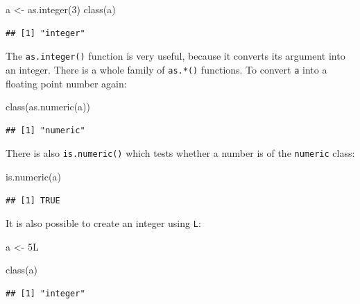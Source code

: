 \documentclass[
]{article}
\newenvironment{Shaded}{\begin{snugshade}}{\end{snugshade}}
\newcommand{\DecValTok}[1]{\textcolor[rgb]{0.00,0.00,0.81}{#1}}
\newcommand{\FunctionTok}[1]{\textcolor[rgb]{0.00,0.00,0.00}{#1}}
\newcommand{\NormalTok}[1]{#1}
\newcommand{\OtherTok}[1]{\textcolor[rgb]{0.56,0.35,0.01}{#1}}
\begin{document}
\begin{Shaded}
\begin{Highlighting}[]
\NormalTok{a  }\OtherTok{\textless{}{-}} \FunctionTok{as.integer}\NormalTok{(}\DecValTok{3}\NormalTok{)}
\FunctionTok{class}\NormalTok{(a)}
\end{Highlighting}
\end{Shaded}

\begin{verbatim}
## [1] "integer"
\end{verbatim}

The \texttt{as.integer()} function is very useful, because it converts its argument into an integer. There
is a whole family of \texttt{as.*()} functions. To convert \texttt{a} into a floating point number again:

\begin{Shaded}
\begin{Highlighting}[]
\FunctionTok{class}\NormalTok{(}\FunctionTok{as.numeric}\NormalTok{(a))}
\end{Highlighting}
\end{Shaded}

\begin{verbatim}
## [1] "numeric"
\end{verbatim}

There is also \texttt{is.numeric()} which tests whether a number is of the \texttt{numeric} class:

\begin{Shaded}
\begin{Highlighting}[]
\FunctionTok{is.numeric}\NormalTok{(a)}
\end{Highlighting}
\end{Shaded}

\begin{verbatim}
## [1] TRUE
\end{verbatim}

It is also possible to create an integer using \texttt{L}:

\begin{Shaded}
\begin{Highlighting}[]
\NormalTok{a }\OtherTok{\textless{}{-}}\NormalTok{ 5L}

\FunctionTok{class}\NormalTok{(a)}
\end{Highlighting}
\end{Shaded}

\begin{verbatim}
## [1] "integer"
\end{verbatim}
\end{document}
